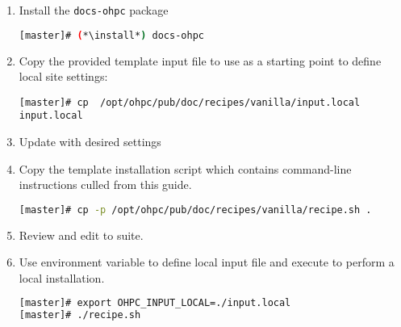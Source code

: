 \begin{enumerate}
\item Install the \texttt{docs-ohpc} package

\begin{lstlisting}[language=bash,keywords={}]
[master]# (*\install*) docs-ohpc
\end{lstlisting}

\item Copy the provided template input file to use as a starting point to
  define local site settings:
\begin{lstlisting}
[master]# cp  /opt/ohpc/pub/doc/recipes/vanilla/input.local input.local
\end{lstlisting}

\item Update  with desired settings

\item Copy the template installation script which contains command-line
  instructions culled from this guide.

\begin{lstlisting}[language=bash,keywords={}]
[master]# cp -p /opt/ohpc/pub/doc/recipes/vanilla/recipe.sh .
\end{lstlisting}

\item Review and edit  to suite.

\item Use environment variable to define local input file and execute
   to perform a local installation.

\begin{lstlisting}[language=bash,keywords={}]
[master]# export OHPC_INPUT_LOCAL=./input.local
[master]# ./recipe.sh
\end{lstlisting}
\end{enumerate}



